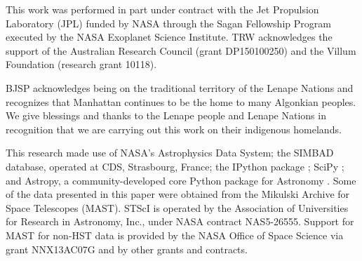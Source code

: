 \documentclass[modern]{aastex62}
\begin{document}
This work was performed in part under contract with the Jet Propulsion Laboratory (JPL) funded by NASA through the Sagan Fellowship Program executed by the NASA Exoplanet Science Institute. TRW acknowledges the support of the Australian Research Council (grant DP150100250) and the Villum Foundation (research grant 10118). 

BJSP acknowledges being on the traditional territory of the Lenape Nations and recognizes that Manhattan continues to be the home to many Algonkian peoples. We give blessings and thanks to the Lenape people and Lenape Nations in recognition that we are carrying out this work on their indigenous homelands.
%

This research made use of NASA's Astrophysics Data System; the SIMBAD database, operated at CDS, Strasbourg, France; the IPython package \citep{PER-GRA:2007}; SciPy \citep{scipy}; and Astropy, a community-developed core Python package for Astronomy \citep{astropy}. Some of the data presented in this paper were obtained from the Mikulski Archive for Space Telescopes (MAST). STScI is operated by the Association of Universities for Research in Astronomy, Inc., under NASA contract NAS5-26555. Support for MAST for non-HST data is provided by the NASA Office of Space Science via grant NNX13AC07G and by other grants and contracts. 








\end{document}
